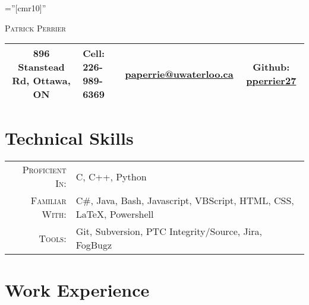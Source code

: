 \documentclass[a4paper,10pt]{article}
\newcommand\Tstrut{\rule{0pt}{2.9ex}}         %
\newcommand\Bstrut{\rule[-1.2ex]{0pt}{0pt}}   %
\newcommand\TBstrut{\Tstrut\Bstrut}           %
\begin{document}
\pagestyle{empty} %

\font\fb=''[cmr10]'' %

\par{\centering
		{\Huge \textsc{Patrick Perrier}
	}\bigskip\par}
\par{
	\begin{tabularx}{\textwidth}{c X X c}
		\hline
		896 Stanstead Rd, Ottawa, ON & Cell: 226-989-6369 
		& \href{mailto:paperrie@uwaterloo.ca}{paperrie@uwaterloo.ca}
		& Github: \href{https://github.com/pperrier27}{pperrier27} \TBstrut \\
		\hline
	\end{tabularx}
}
\section{Technical Skills}

\begin{tabular}{rl}
    \textsc{Proficient In:} & C, C++, Python \\
    \textsc{Familiar With:} & C\#, Java, Bash, Javascript, VBScript, HTML, CSS, \LaTeX, Powershell\\
   	\textsc{Tools:} & Git, Subversion, PTC Integrity/Source, Jira, FogBugz
\end{tabular}

\section{Work Experience}


\end{document}

